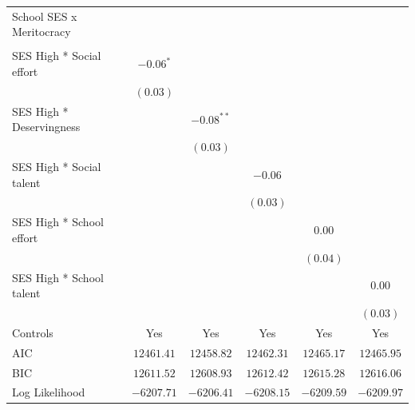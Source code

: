 \documentclass[
  12pt,
  letterpaper,
]{article}
\begin{document}
\begin{table}
{\begin{center}
{\begin{threeparttable}
\begin{tabular}{l c c c c c}
School SES x Meritocracy                  &               &               &               &               &               \\
                                          &               &               &               &               &               \\
\quad SES High * Social effort            & $-0.06^{*}$   &               &               &               &               \\
                                          & $(0.03)$      &               &               &               &               \\
\quad SES High * Deservingness            &               & $-0.08^{**}$  &               &               &               \\
                                          &               & $(0.03)$      &               &               &               \\
\quad SES High * Social talent            &               &               & $-0.06$       &               &               \\
                                          &               &               & $(0.03)$      &               &               \\
\quad SES High * School effort            &               &               &               & $0.00$        &               \\
                                          &               &               &               & $(0.04)$      &               \\
\quad SES High * School talent            &               &               &               &               & $0.00$        \\
                                          &               &               &               &               & $(0.03)$      \\
\midrule
Controls                                  & Yes           & Yes           & Yes           & Yes           & Yes           \\
AIC                                       & $12461.41$    & $12458.82$    & $12462.31$    & $12465.17$    & $12465.95$    \\
BIC                                       & $12611.52$    & $12608.93$    & $12612.42$    & $12615.28$    & $12616.06$    \\
Log Likelihood                            & $-6207.71$    & $-6206.41$    & $-6208.15$    & $-6209.59$    & $-6209.97$    \\

\end{tabular}
\end{threeparttable}}
\end{center}}
\end{table}
\end{document}
